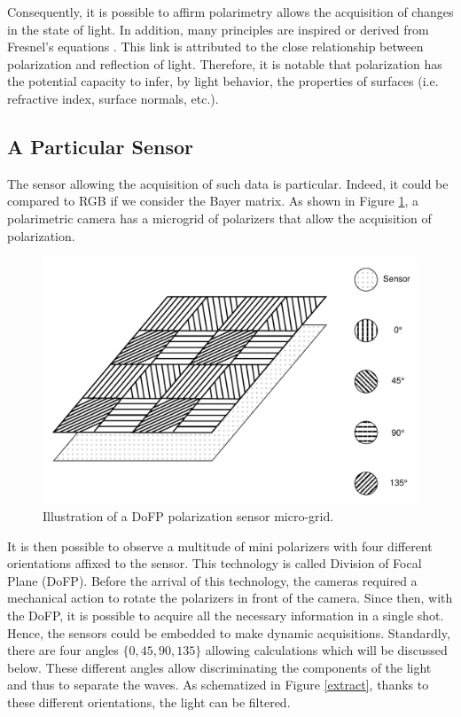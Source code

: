 Consequently, it is possible to affirm polarimetry allows the acquisition of changes in the state of light\cite{wolff1995polarization}. In addition, many principles are inspired or derived from Fresnel's equations \cite{fresnel1868oeuvres}. This link is attributed to the close relationship between polarization and reflection of light. Therefore, it is notable that polarization has the potential capacity to infer, by light behavior, the properties of surfaces (i.e. refractive index, surface normals, etc.).



\subsection{A Particular Sensor}\label{particularsensor}

The sensor allowing the acquisition of such data is particular.
Indeed, it could be compared to RGB if we consider the Bayer matrix. As shown in Figure \ref{fig:sensor}, a polarimetric camera has a microgrid of polarizers that allow the acquisition of polarization.

\begin{figure}[h]
	\centering
	\includegraphics[width=0.8\linewidth]{Figures/Preliminary/sensor}
	\caption{Illustration of a DoFP polarization sensor micro-grid.}
	\label{fig:sensor}
\end{figure}

It is then possible to observe a multitude of mini polarizers with four different orientations affixed to the sensor. This technology is called Division of Focal Plane (DoFP).
Before the arrival of this technology, the cameras required a mechanical action to rotate the polarizers in front of the camera. Since then, with the DoFP, it is possible to acquire all the necessary information in a single shot. Hence, the sensors could be embedded to make dynamic acquisitions.
Standardly, there are four angles $\{0,45,90,135\}$ allowing calculations which will be discussed below.
These different angles allow discriminating the components of the light and thus to separate the waves. As schematized in Figure \ref{extract}, thanks to these different orientations, the light can be filtered.

